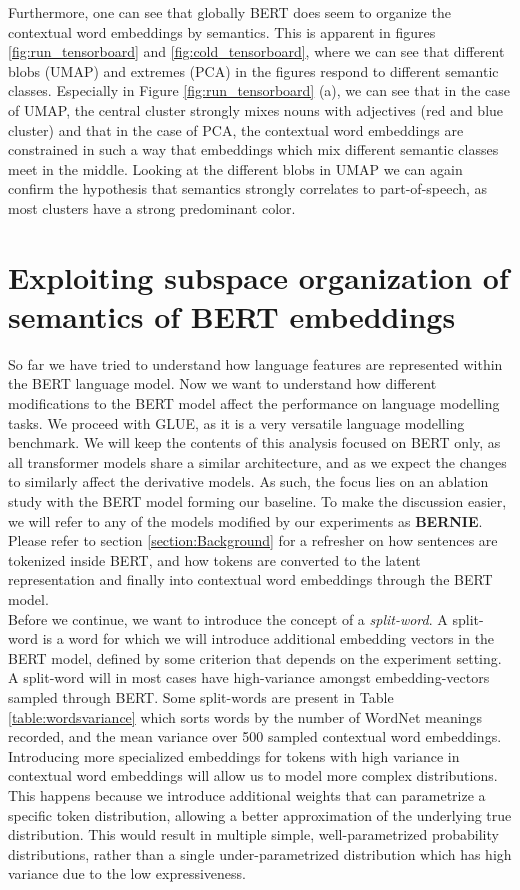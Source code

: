 \documentclass[a4paper,12pt,oneside,openright]{report}
\begin{document}
Furthermore, one can see that globally BERT does seem to organize the contextual word embeddings by semantics. 
This is apparent in figures \ref{fig:run_tensorboard} and \ref{fig:cold_tensorboard}, where we can see that different blobs (UMAP) and extremes (PCA) in the figures respond to different semantic classes.
Especially in Figure \ref{fig:run_tensorboard} (a), we can see that in the case of UMAP, the central cluster strongly mixes nouns with adjectives (red and blue cluster) and that in the case of PCA, the contextual word embeddings are constrained in such a way that embeddings which mix different semantic classes meet in the middle.
Looking at the different blobs in UMAP we can again confirm the hypothesis that semantics strongly correlates to part-of-speech, as most clusters have a strong predominant color. \\

\chapter{Exploiting subspace organization of semantics of BERT embeddings}\label{section:ExploitingBERT}

So far we have tried to understand how language features are represented within the BERT language model.
Now we want to understand how different modifications to the BERT model affect the performance on language modelling tasks.
We proceed with GLUE, as it is a very versatile language modelling benchmark.
We will keep the contents of this analysis focused on BERT only, as all transformer models share a similar architecture, and as we expect the changes to similarly affect the derivative models.
As such, the focus lies on an ablation study with the BERT model forming our baseline.
To make the discussion easier, we will refer to any of the models modified by our experiments as \textbf{BERNIE}. 
Please refer to section \ref{section:Background} for a refresher on how sentences are tokenized inside BERT, and how tokens are converted to the latent representation and finally into contextual word embeddings through the BERT model.
\\

Before we continue, we want to introduce the concept of a \textit{split-word}. A split-word is a word for which we will introduce additional embedding vectors in the BERT model, defined by some criterion that depends on the experiment setting.
A split-word will in most cases have high-variance amongst embedding-vectors sampled through BERT.
Some split-words are present in Table \ref{table:wordsvariance} which sorts words by the number of WordNet meanings recorded, and the mean variance over 500 sampled contextual word embeddings.
Introducing more specialized embeddings for tokens with high variance in contextual word embeddings will allow us to model more complex distributions.
This happens because we introduce additional weights that can parametrize a specific token distribution, allowing a better approximation of the underlying true distribution.
This would result in multiple simple, well-parametrized probability distributions, rather than a single under-parametrized distribution which has high variance due to the low expressiveness.
\end{document}
